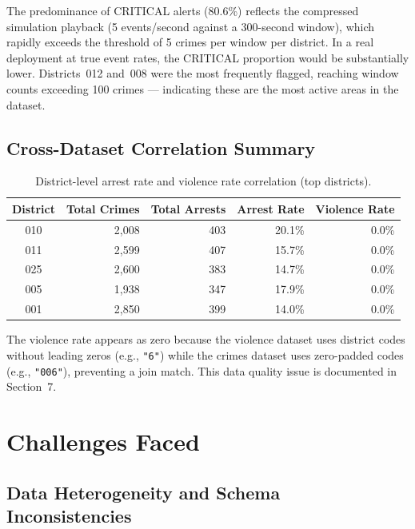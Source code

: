 \documentclass[11pt,a4paper]{article}
\begin{document}
The predominance of CRITICAL alerts (80.6\%) reflects the compressed
simulation playback (5 events/second against a 300-second window), which
rapidly exceeds the threshold of 5 crimes per window per district. In a
real deployment at true event rates, the CRITICAL proportion would be
substantially lower. Districts~012 and~008 were the most frequently
flagged, reaching window counts exceeding 100 crimes — indicating these
are the most active areas in the dataset.

\subsection{Cross-Dataset Correlation Summary}

\begin{table}[H]
\centering
\caption{District-level arrest rate and violence rate correlation (top districts).}
\label{tab:corr}
\begin{tabular}{@{}crrrr@{}}
\toprule
\textbf{District} & \textbf{Total Crimes} & \textbf{Total Arrests} & \textbf{Arrest Rate} & \textbf{Violence Rate} \\
\midrule
010 & 2{,}008 & 403 & 20.1\% & 0.0\% \\
011 & 2{,}599 & 407 & 15.7\% & 0.0\% \\
025 & 2{,}600 & 383 & 14.7\% & 0.0\% \\
005 & 1{,}938 & 347 & 17.9\% & 0.0\% \\
001 & 2{,}850 & 399 & 14.0\% & 0.0\% \\
\bottomrule
\end{tabular}
\end{table}

The violence rate appears as zero because the violence dataset uses
district codes without leading zeros (e.g., \texttt{"6"}) while the
crimes dataset uses zero-padded codes (e.g., \texttt{"006"}), preventing
a join match. This data quality issue is documented in Section~7.

\section{Challenges Faced}

\subsection{Data Heterogeneity and Schema Inconsistencies}
\end{document}
